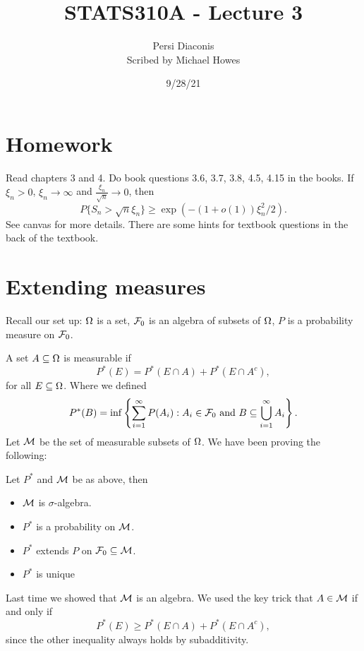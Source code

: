 




\title{STATS310A - Lecture 3}
\author{Persi Diaconis\\ Scribed by Michael Howes}
\date{9/28/21}

\pagestyle{fancy}
\fancyhf{}


\maketitle
\tableofcontents
\section{Homework}
Read chapters 3 and 4.
Do book questions 3.6, 3.7, 3.8, 4.5, 4.15 in the books.
If $\xi_n > 0$, $\xi_n \to \infty$ and $\frac{\xi_n}{\sqrt{n}} \to 0$, then 
\[P\{S_n > \sqrt{n}\xi_n\} \ge \exp(-(1+o(1))\xi_n^2/2). \]
See canvas for more details. There are some hints for textbook questions in the back of the textbook.

\section{Extending measures}
Recall our set up: ${{\Omega}}$ is a set, ${\mathcal{F}}_0$ is an algebra of subsets of ${{\Omega}}$, $P$ is a probability measure on ${\mathcal{F}}_0$.

A set $A \subseteq {{\Omega}}$ is measurable if
\[P^*(E) = P^*(E \cap A) + P^*(E \cap A^c), \]
for all $E \subseteq {{\Omega}}$. Where we defined
\[P^*(B) = \inf\left\{\sum_{i=1}^\infty P(A_i) : A_i \in {\mathcal{F}}_0 \text{ and } B \subseteq \bigcup_{i=1}^\infty A_i\right\}. \]
Let ${\mathcal{M}}$ be the set of measurable subsets of ${{\Omega}}$. We have been proving the following:
\begin{thrm}
    Let $P^*$ and ${\mathcal{M}}$ be as above, then
    \begin{itemize}
        \item ${\mathcal{M}}$ is $\sigma$-algebra.
        \item $P^*$ is a probability on ${\mathcal{M}}$.
        \item $P^*$ extends $P$ on ${\mathcal{F}}_0 \subseteq {\mathcal{M}}$.
        \item $P^*$ is unique
    \end{itemize}
\end{thrm}
Last time we showed that ${\mathcal{M}}$ is an algebra. We used the key trick that $A \in {\mathcal{M}}$ if and only if
\[P^*(E) \ge P^*(E \cap A) + P^*(E \cap A^c), \]
since the other inequality always holds by subadditivity.

